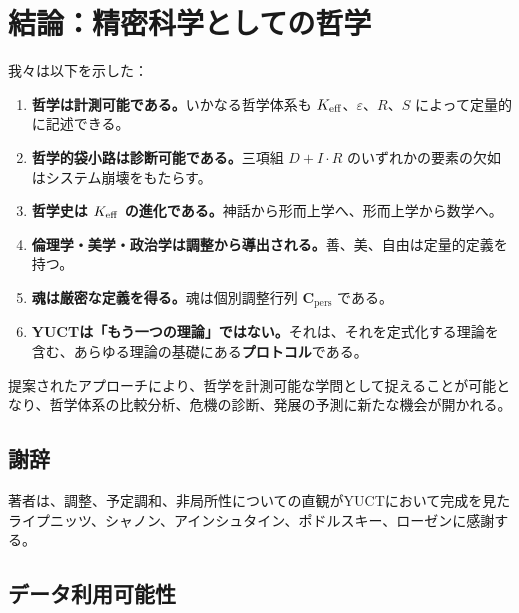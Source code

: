\documentclass[11pt,a4paper]{article}
\newcommand{\eps}{\varepsilon}
\newcommand{\Cpers}{\mathbf{C}_{\text{pers}}}
\begin{document}
	
	\section{結論：精密科学としての哲学}
	
	我々は以下を示した：
	
	\begin{enumerate}
		\item \textbf{哲学は計測可能である。}いかなる哲学体系も \(\Keff\)、\(\eps\)、\(R\)、\(S\) によって定量的に記述できる。
		\item \textbf{哲学的袋小路は診断可能である。}三項組 \(D + I \cdot R\) のいずれかの要素の欠如はシステム崩壊をもたらす。
		\item \textbf{哲学史は \(\Keff\) の進化である。}神話から形而上学へ、形而上学から数学へ。
		\item \textbf{倫理学・美学・政治学は調整から導出される。}善、美、自由は定量的定義を持つ。
		\item \textbf{魂は厳密な定義を得る。}魂は個別調整行列 \(\Cpers\) である。
		\item \textbf{YUCTは「もう一つの理論」ではない。}それは、それを定式化する理論を含む、あらゆる理論の基礎にある\textbf{プロトコル}である。
	\end{enumerate}
	
	提案されたアプローチにより、哲学を計測可能な学問として捉えることが可能となり、哲学体系の比較分析、危機の診断、発展の予測に新たな機会が開かれる。
	
	\begin{center}
	\end{center}
	
	\subsection*{謝辞}
	
	著者は、調整、予定調和、非局所性についての直観がYUCTにおいて完成を見たライプニッツ、シャノン、アインシュタイン、ポドルスキー、ローゼンに感謝する。
	
	\subsection*{データ利用可能性}
	
\end{document}
